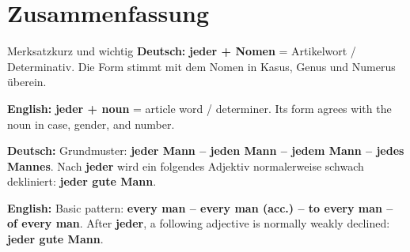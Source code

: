\documentclass[a4paper,11pt]{article}
\newcommand{\GermanText}[1]{\textbf{Deutsch: }#1\par}
\newcommand{\EnglishText}[1]{{\small\color{SoftGray}\textbf{English: }#1\par}}
\begin{document}
\section{Zusammenfassung}
\begin{grammarentry}{Merksatz}{kurz und wichtig}
\GermanText{\textbf{jeder + Nomen} = Artikelwort / Determinativ. Die Form stimmt mit dem Nomen in Kasus, Genus und Numerus überein.}
\EnglishText{\textbf{jeder + noun} = article word / determiner. Its form agrees with the noun in case, gender, and number.}
\GermanText{Grundmuster: \textbf{jeder Mann -- jeden Mann -- jedem Mann -- jedes Mannes}. Nach \textbf{jeder} wird ein folgendes Adjektiv normalerweise schwach dekliniert: \textbf{jeder gute Mann}.}
\EnglishText{Basic pattern: \textbf{every man -- every man (acc.) -- to every man -- of every man}. After \textbf{jeder}, a following adjective is normally weakly declined: \textbf{jeder gute Mann}.}
\end{grammarentry}
\end{document}
